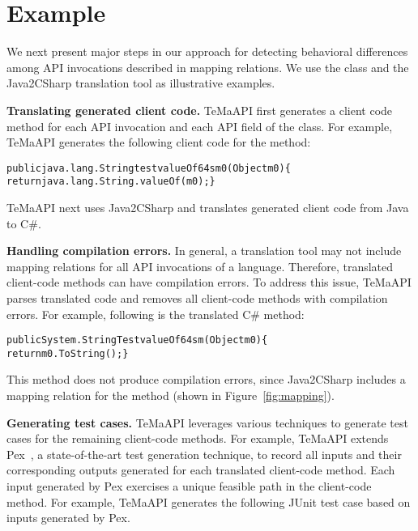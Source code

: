 \section{Example}
\label{sec:example}

We next present major steps in our approach for detecting behavioral differences among API invocations described in mapping relations. We use the  class and the Java2CSharp translation tool as illustrative examples. 

\textbf{Translating generated client code.} TeMaAPI first generates a client code method for each API invocation and each API field of the  class. For example, TeMaAPI generates the following client code for the  method:

\begin{CodeOut}%
\begin{alltt}
  public java.lang.String testvalueOf64sm0(Object m0) \{
    return java.lang.String.valueOf(m0); \}
\end{alltt}
\end{CodeOut}

TeMaAPI next uses Java2CSharp and translates generated client code from Java to C\#.

\textbf{Handling compilation errors.} In general, a translation tool may not include mapping relations for all API invocations of a language. Therefore, translated client-code methods can have compilation errors. To address this issue, TeMaAPI parses translated code and removes all client-code methods with compilation errors. For example, following is the translated C\#  method:

\begin{CodeOut}%
\begin{alltt}
  public System.String TestvalueOf64sm(Object m0) \{
    return m0.ToString();\}
\end{alltt}
\end{CodeOut}

This method does not produce compilation errors, since Java2CSharp includes a mapping relation for the method (shown in Figure~\ref{fig:mapping}).

\textbf{Generating test cases.} TeMaAPI leverages various techniques to generate test cases for the remaining client-code methods. For example, TeMaAPI extends Pex~\cite{tillmann2008pex}, a state-of-the-art test generation technique, to record all inputs and their corresponding outputs generated for each translated client-code method. Each input generated by Pex exercises a unique feasible path in the client-code method. For example, TeMaAPI generates the following JUnit test case based on inputs generated by Pex.

